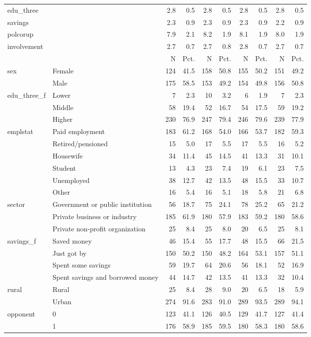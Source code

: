 \begin{table}
\begin{tabular}[t]{llrrrrrrrr}
edu\_three &  & 2.8 & 0.5 & 2.8 & 0.5 & 2.8 & 0.5 & 2.8 & 0.5\\
savings &  & 2.3 & 0.9 & 2.3 & 0.9 & 2.3 & 0.9 & 2.2 & 0.9\\
polcorup &  & 7.9 & 2.1 & 8.2 & 1.9 & 8.1 & 1.9 & 8.0 & 1.9\\
involvement &  & 2.7 & 0.7 & 2.7 & 0.8 & 2.8 & 0.7 & 2.7 & 0.7\\
\midrule
 &  & N & Pct. & N & Pct. & N & Pct. & N & Pct.\\
sex & Female & 124 & 41.5 & 158 & 50.8 & 155 & 50.2 & 151 & 49.2\\
 & Male & 175 & 58.5 & 153 & 49.2 & 154 & 49.8 & 156 & 50.8\\
edu\_three\_f & Lower & 7 & 2.3 & 10 & 3.2 & 6 & 1.9 & 7 & 2.3\\
 & Middle & 58 & 19.4 & 52 & 16.7 & 54 & 17.5 & 59 & 19.2\\
 & Higher & 230 & 76.9 & 247 & 79.4 & 246 & 79.6 & 239 & 77.9\\
emplstat & Paid employment & 183 & 61.2 & 168 & 54.0 & 166 & 53.7 & 182 & 59.3\\
 & Retired/pensioned & 15 & 5.0 & 17 & 5.5 & 17 & 5.5 & 16 & 5.2\\
 & Housewife & 34 & 11.4 & 45 & 14.5 & 41 & 13.3 & 31 & 10.1\\
 & Student & 13 & 4.3 & 23 & 7.4 & 19 & 6.1 & 23 & 7.5\\
 & Unemployed & 38 & 12.7 & 42 & 13.5 & 48 & 15.5 & 33 & 10.7\\
 & Other & 16 & 5.4 & 16 & 5.1 & 18 & 5.8 & 21 & 6.8\\
sector & Government or public institution & 56 & 18.7 & 75 & 24.1 & 78 & 25.2 & 65 & 21.2\\
 & Private business or industry & 185 & 61.9 & 180 & 57.9 & 183 & 59.2 & 180 & 58.6\\
 & Private non-profit organization & 25 & 8.4 & 25 & 8.0 & 20 & 6.5 & 25 & 8.1\\
savings\_f & Saved money & 46 & 15.4 & 55 & 17.7 & 48 & 15.5 & 66 & 21.5\\
 & Just got by & 150 & 50.2 & 150 & 48.2 & 164 & 53.1 & 157 & 51.1\\
 & Spent some savings & 59 & 19.7 & 64 & 20.6 & 56 & 18.1 & 52 & 16.9\\
 & Spent savings and
borrowed money & 44 & 14.7 & 42 & 13.5 & 41 & 13.3 & 32 & 10.4\\
rural & Rural & 25 & 8.4 & 28 & 9.0 & 20 & 6.5 & 18 & 5.9\\
 & Urban & 274 & 91.6 & 283 & 91.0 & 289 & 93.5 & 289 & 94.1\\
opponent & 0 & 123 & 41.1 & 126 & 40.5 & 129 & 41.7 & 127 & 41.4\\
 & 1 & 176 & 58.9 & 185 & 59.5 & 180 & 58.3 & 180 & 58.6\\
\bottomrule
\end{tabular}
\end{table}
